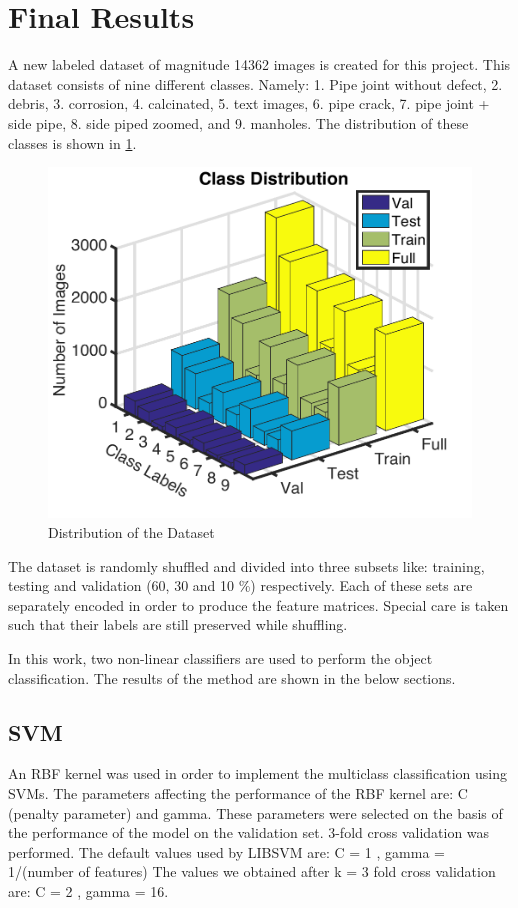 \documentclass[letterpaper,12pt, onecolumn]{article}%
\begin{document}
\begin{enumerate}
\end{enumerate}

\section{Final Results} \label{sec:final_results}
\noindent
A new labeled dataset of magnitude 14362 images is created for this project. This dataset consists of nine different classes. Namely: 1. Pipe joint without defect, 2. debris, 3. corrosion, 4. calcinated, 5. text images,  6. pipe crack, 7. pipe joint + side pipe, 8. side piped zoomed, and 9. manholes. The distribution of these classes is shown in \cref{fig:class_distribution}.
\begin{figure}[!hbtp]
 	  \centering
 	   \includegraphics[scale=0.75] {fig_class_distribution.pdf} 
 	   \caption{Distribution of the Dataset }
       \label{fig:class_distribution}
\end{figure}

The dataset is randomly shuffled and divided into three subsets like: training, testing and validation (60, 30 and 10 \%) respectively. Each of these sets are separately encoded in order to produce the feature matrices. Special care is taken such that their labels are still preserved while shuffling.

In this work, two non-linear classifiers are used to perform the object classification. The results of the method are shown in the below sections.
\subsection{SVM}
An RBF kernel was used in order to implement the multiclass classification using SVMs. The parameters affecting the performance of the RBF kernel are: C (penalty parameter) and gamma. 
These parameters were selected on the basis of the performance of the model on the validation set.
3-fold cross validation was performed. The default values used by LIBSVM are:
C = 1 , gamma = 1/(number of features)
The values we obtained after k = 3 fold cross validation are:
C = 2 , gamma = 16.
\end{document}
